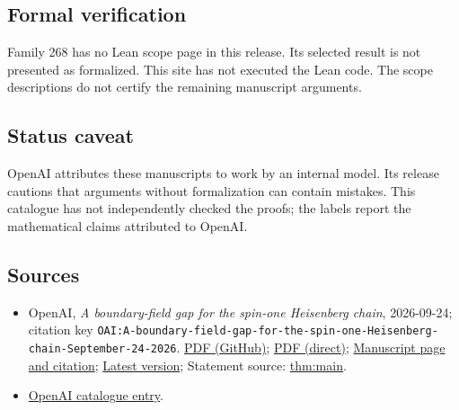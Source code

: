 \documentclass[11pt]{article}
\begin{document}
\subsection{Formal verification}
Family 268 has no Lean scope page in this release. Its selected result is not presented as formalized. This site has not executed the Lean code. The scope descriptions do not certify the remaining manuscript arguments.

\subsection{Status caveat}
OpenAI attributes these manuscripts to work by an internal model. Its release cautions that arguments without formalization can contain mistakes. This catalogue has not independently checked the proofs; the labels report the mathematical claims attributed to OpenAI.

\subsection{Sources}
\begin{itemize}
\item OpenAI, \emph{A boundary-field gap for the spin-one Heisenberg chain}, 2026-09-24; citation key \texttt{OAI:A-boundary-field-gap-for-the-spin-one-Heisenberg-chain-September-24-2026}. \href{https://github.com/openai/math/blob/adc7f1241b42e322a6451854ab7e4b4c146bf78a/preprints/A-boundary-field-gap-for-the-spin-one-Heisenberg-chain-September-24-2026/paper.pdf}{PDF (GitHub)}; \href{https://github.com/openai/math/raw/adc7f1241b42e322a6451854ab7e4b4c146bf78a/preprints/A-boundary-field-gap-for-the-spin-one-Heisenberg-chain-September-24-2026/paper.pdf}{PDF (direct)}; \href{https://github.com/openai/math/blob/adc7f1241b42e322a6451854ab7e4b4c146bf78a/preprints/A-boundary-field-gap-for-the-spin-one-Heisenberg-chain-September-24-2026/README.md}{Manuscript page and citation}; \href{https://github.com/openai/math/blob/main/preprints/A-boundary-field-gap-for-the-spin-one-Heisenberg-chain-September-24-2026/paper.pdf}{Latest version}; Statement source: \href{https://github.com/openai/math/blob/adc7f1241b42e322a6451854ab7e4b4c146bf78a/preprints/A-boundary-field-gap-for-the-spin-one-Heisenberg-chain-September-24-2026/build/main.tex\#L77}{thm:main}.
\item \href{https://github.com/openai/math/blob/adc7f1241b42e322a6451854ab7e4b4c146bf78a/CONTENTS.md}{OpenAI catalogue entry}.
\end{itemize}
\end{document}
